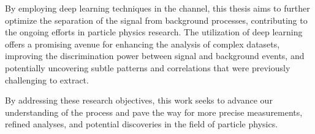 By employing deep learning techniques in the \lss channel, this thesis aims to further optimize the separation of the
\ttH signal from background processes, contributing to the ongoing efforts in particle physics research. The utilization
of deep learning offers a promising avenue for enhancing the analysis of complex datasets, improving the discrimination
power between signal and background events, and potentially uncovering subtle patterns and correlations that were
previously challenging to extract.

By addressing these research objectives, this work seeks to advance our understanding of the \ttH process and pave the
way for more precise measurements, refined analyses, and potential discoveries in the field of particle physics.